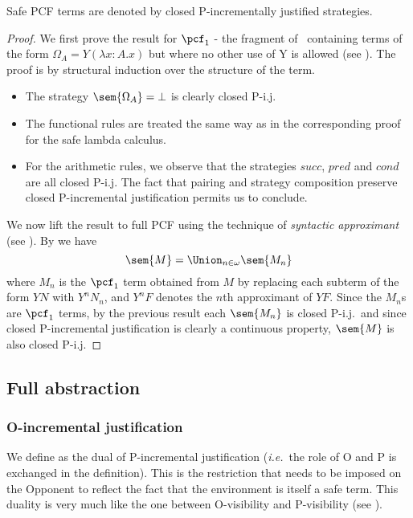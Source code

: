 \begin{proposition}
\label{prop:safepcf_closedpij} Safe PCF terms are denoted by closed
P-incrementally justified strategies.
\end{proposition}
\begin{proof}
We first prove the result for $\pcf_1$ - the fragment of \pcf\
containing terms of the form $\Omega_A = Y (\lambda x : A.x)$ but
where no other use of Y is allowed (see
\cite{abramsky:game-semantics-tutorial}). The proof is by structural
induction over the structure of the term.
\begin{itemize}
\item The strategy $\sem{\Omega_A} = \bot$ is
clearly closed P-i.j.

\item The functional rules are treated the same way as in the
corresponding proof for the safe lambda calculus.

\item For the arithmetic rules, we observe that the strategies
$succ$, $pred$ and $cond$ are all closed P-i.j. The fact that
pairing and strategy composition preserve closed P-incremental
justification permits us to conclude.
\end{itemize}

We now lift the result to full PCF using the technique of
\emph{syntactic approximant} (see
\cite{abramsky:game-semantics-tutorial}). By \cite[lemma
16]{abramsky:game-semantics-tutorial} we have
$$ \sem{M} = \Union_{n\in\omega} \sem{M_n}$$
where $M_n$ is the $\pcf_1$ term obtained from $M$ by replacing each
subterm of the form $Y N$ with $Y^n N_n$, and $Y^n F$ denotes the
$n$th approximant of $Y F$. Since the $M_n$s are $\pcf_1$ terms, by
the previous result each $\sem{M_n}$ is closed P-i.j.\ and since
closed P-incremental justification is clearly a continuous property,
$\sem{M}$ is also closed P-i.j.
\end{proof}


\subsection{Full abstraction}

\subsubsection{O-incremental justification}

We define  as the dual of
P-incremental justification ({\it i.e.}~the role of O and P is
exchanged in the definition). This is the restriction that needs to
be imposed on the Opponent to reflect the fact that the environment
is itself a safe term. This duality is very much like the one
between O-visibility and P-visibility (see
\cite[Sec.~3.6]{Harmer2005}).


